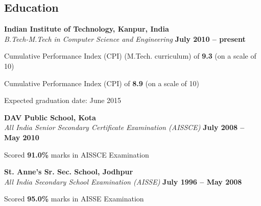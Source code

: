 \documentclass[margin,line]{resume}
\begin{document}
\begin{resume}
  \section{\mysidestyle Education}

  \textbf{Indian Institute of Technology, Kanpur, India} \vspace{2mm}\\\vspace{1mm}%
  \textsl{B.Tech-M.Tech in Computer Science and Engineering} \hfill \textbf{July 2010 -- present}\vspace{-3mm}\\\vspace{-1mm}%
  \begin{list2}
  \item Cumulative Performance Index (CPI) (M.Tech. curriculum) of \textbf{\textsf{9.3}} (on a scale of 10)
  \item Cumulative Performance Index (CPI) of \textbf{\textsf{8.9}} (on a scale of 10)
  \item Expected graduation date: June 2015
  \end{list2}\vspace{-1.5mm}
  \textbf{DAV Public School, Kota} \vspace{2mm}\\\vspace{1mm}%
  \textsl{All India Senior Secondary Certificate Examination (AISSCE)} \hfill \textbf{July 2008 -- May 2010}\vspace{-3mm}\\\vspace{-1mm}%
  \begin{list2}
  \item Scored \textbf{\textsf{91.0\%}} marks in AISSCE Examination
  \end{list2}
  \textbf{St. Anne's Sr. Sec. School, Jodhpur} \vspace{2mm}\\\vspace{1mm}%
  \textsl{All India Secondary School Examination (AISSE)} \hfill \textbf{July 1996 -- May 2008}\vspace{-3mm}\\\vspace{-1mm}%
  \begin{list2}
  \item Scored \textbf{\textsf {95.0\%}} marks in AISSE Examination
  \end{list2}
  \vspace{-1mm}%



\end{resume}
\end{document}
